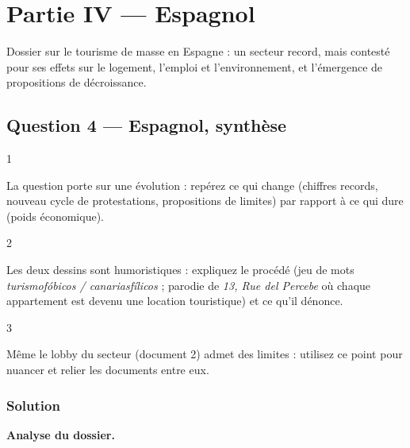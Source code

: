 \documentclass[11pt,a4paper]{article}
\begin{document}
\hypertarget{partie-iv-espagnol}{%
\section{Partie IV --- Espagnol}\label{partie-iv-espagnol}}

Dossier sur le tourisme de masse en Espagne : un secteur record, mais contesté pour ses effets sur le logement, l'emploi et l'environnement, et l'émergence de propositions de décroissance.

\hypertarget{question-4-espagnol-synthuxe8se}{%
\subsection{Question 4 --- Espagnol, synthèse}\label{question-4-espagnol-synthuxe8se}}

\begin{indication}{1}

La question porte sur une évolution : repérez ce qui change (chiffres records, nouveau cycle de protestations, propositions de limites) par rapport à ce qui dure (poids économique).

\end{indication}

\begin{indication}{2}

Les deux dessins sont humoristiques : expliquez le procédé (jeu de mots \emph{turismofóbicos / canariasfílicos} ; parodie de \emph{13, Rue del Percebe} où chaque appartement est devenu une location touristique) et ce qu'il dénonce.

\end{indication}

\begin{indication}{3}

Même le lobby du secteur (document 2) admet des limites : utilisez ce point pour nuancer et relier les documents entre eux.

\end{indication}

\hypertarget{solution-3}{%
\subsubsection{Solution}\label{solution-3}}

\textbf{Analyse du dossier.}
\end{document}
